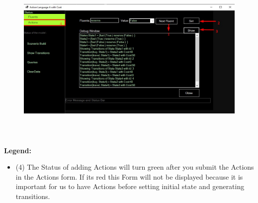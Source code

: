 \documentclass[12pt]{article}
\begin{document}
\vspace{\baselineskip}



\begin{figure}[H]
	\begin{Center}
		\includegraphics[width=6.26in,height=3.25in]{./media/image7.jpeg}
	\end{Center}
\end{figure}



\par

\textbf{Legend:}\par


\vspace{\baselineskip}
\begin{itemize}
	\item (4) The Status of adding Actions will turn green after you submit the Actions in the Actions form. If its red this Form will not be displayed because it is important for us to have Actions before setting initial state and generating transitions.
\end{itemize}\par
\end{document}
